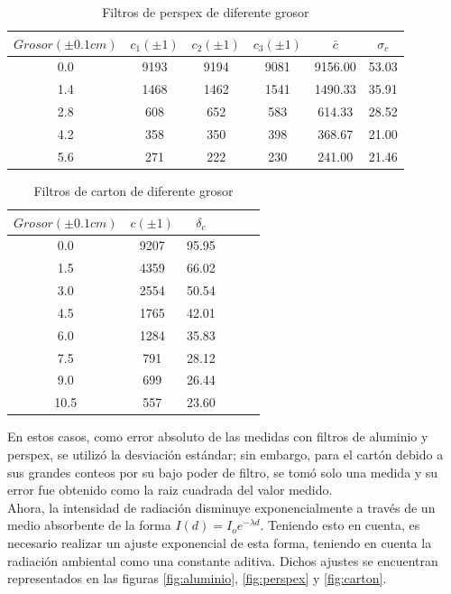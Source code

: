 \documentclass[%
 reprint,
 amsmath,amssymb,
 aps,
]{revtex4-1}
\begin{document}
\begin{table}[h!]
\centering
 \begin{tabular}{|c|c|c|c|c|c|} 
 \hline
 $Grosor(\pm0.1cm)$ & $c_1(\pm1)$ & $c_2(\pm1)$ & $c_3(\pm1)$ & $\bar{c}$ & $\sigma_c$ \\ [0.5ex] 
 \hline\hline
 0.0&9193&9194&9081&9156.00&53.03\\
 1.4&1468&1462&1541&1490.33&35.91\\
 2.8&608&652&583&614.33&28.52\\
 4.2&358&350&398&368.67&21.00\\
 5.6&271&222&230&241.00&21.46\\
[1ex] 
 \hline
 \end{tabular}
 \caption{Filtros de perspex de diferente grosor}
 \label{table:perspex}
\end{table}

\begin{table}[h!]
\centering
 \begin{tabular}{|c|c|c|c|c|c|} 
 \hline
 $Grosor(\pm0.1cm)$ & $c(\pm1)$ & $\delta_c$ \\ [0.5ex] 
 \hline\hline
 0.0&9207&95.95\\
 1.5&4359&66.02\\
 3.0&2554&50.54\\
 4.5&1765&42.01\\
 6.0&1284&35.83\\
 7.5&791&28.12\\
 9.0&699&26.44\\
 10.5&557&23.60\\
[1ex] 
 \hline
 \end{tabular}
 \caption{Filtros de carton de diferente grosor}
 \label{table:carton}
\end{table}

En estos casos, como error absoluto de las medidas con filtros de aluminio y perspex, se utilizó la desviación estándar; sin embargo, para el cartón debido a sus grandes conteos por su bajo poder de filtro, se tomó solo una medida y su error fue obtenido como la raiz cuadrada del valor medido. \\

Ahora, la intensidad de radiación disminuye exponencialmente a través de un medio absorbente de la forma $I(d) = I_oe^{-\lambda d}$. Teniendo esto en cuenta, es necesario realizar un ajuste exponencial de esta forma, teniendo en cuenta la radiación ambiental como una constante aditiva. Dichos ajustes se encuentran representados en las figuras \ref{fig:aluminio}, \ref{fig:perspex} y \ref{fig:carton}.\\
\end{document}
